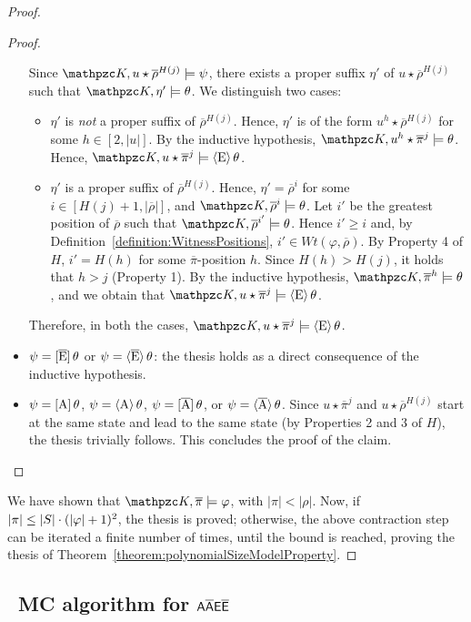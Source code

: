 \begin{proof}
\begin{proof}
\begin{itemize}
Since $\Ku,u\star \overline{\rho}^{H(j)}\models \psi $, there exists a proper suffix $\eta'$ of  $u\star \overline{\rho}^{H(j)}$
 such that  $\Ku,\eta'\models \theta $. We distinguish two cases:
 \begin{itemize}
   \item $\eta'$ is \emph{not} a proper suffix of $\overline{\rho}^{H(j)}$. Hence, $\eta'$ is of the form $u^{h}\star \overline{\rho}^{H(j)}$ for some $h\in [2,|u|]$. By the inductive hypothesis, $\Ku,u^{h}\star\overline{\pi}^j\models \theta $. Hence, $\Ku,u\star\overline{\pi}^j\models \hsE\theta $.
   \item $\eta'$ is a proper suffix of $\overline{\rho}^{H(j)}$. Hence, $\eta' = \overline{\rho}^{i}$ for some $i\in [H(j)+1,|\overline{\rho}|]$, and $\Ku,\overline{\rho}^{i}\models \theta $.
   Let $i'$ be the greatest position of $\overline{\rho}$ such that $\Ku,\overline{\rho}^{i'}\models\theta$. Hence $i'\geq i$ and, by Definition~\ref{definition:WitnessPositions}, $i'\in Wt(\varphi,\overline{\rho})$. By Property 4 of $H$, $i'=H(h)$ for some $\overline{\pi}$-position $h$. Since $H(h)>H(j)$, it holds that $h>j$ (Property 1). By the inductive hypothesis, $\Ku,\overline{\pi}^h\models \theta $, and we obtain that $\Ku,u\star\overline{\pi}^j\models \hsE\theta $.
 \end{itemize}
  Therefore, in both the cases, $\Ku,u\star \overline{\pi}^j\models \hsE\theta $.
 \item $\psi=\operatorname{\mathopen[ \overline{E} \mathclose]}\theta$ or $\psi=\operatorname{\langle \overline{E}\rangle}\theta$: the thesis holds as a direct consequence of the inductive hypothesis.
 \item $\psi = \operatorname{\mathopen[ A \mathclose]}\theta$, $\psi=\operatorname{\langle A\rangle}\theta$, $\psi = \operatorname{\mathopen[ \overline{A} \mathclose]}\theta$, or $\psi=\operatorname{\langle \overline{A}\rangle}\theta$. Since $u\star\overline{\pi}^j$ and $u\star\overline{\rho}^{H(j)}$ start at the same state and lead to the same state (by Properties 2 and 3 of $H$), the thesis trivially follows. This concludes the proof of the claim.\qedhere
\end{itemize}
\end{proof}
%
We have shown that $\Ku,\overline{\pi}\models \varphi$, with $|\pi| < |\rho |$. Now, if $|\pi|\leq |S| \cdot (|\varphi|+1)^2$, the thesis is proved; otherwise, the above contraction step can be iterated a finite number of times, until the bound is reached, proving the thesis of Theorem~\ref{theorem:polynomialSizeModelProperty}.
  \end{proof}
  
\subsection{\PSPACE\ MC algorithm for $\mathsf{A\overline{A}E\overline{E}}$}\label{subsec:MCpolyAAbarEEbar}

